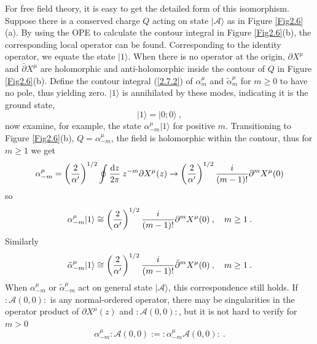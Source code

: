 For free field theory, it is easy to get the detailed form of this isomorphism. Suppose there is a conserved charge $Q$ acting on state $\lvert\mathscr{A}\rangle$ as in Figure \ref{Fig2.6}(a). By using the OPE to calculate the contour integral in Figure \ref{Fig2.6}(b), the corresponding local operator can be found. Corresponding to the identity operator, we equate the state $|1\rangle$.    
When there is no operator at the origin, $\partial X^{\mu}$ and $\bar{\partial} X^{\mu}$ are holomorphic and anti-holomorphic inside the contour of $Q$ in Figure \ref{Fig2.6}(b). Define the contour integral (\ref{2.7.2}) of $\alpha_{m}^{\mu}$ and $\tilde{\alpha}_{m}^{\mu}$ for $m \geq 0$ to have no pole, thus yielding zero.    
$\lvert 1\rangle$ is annihilated by these modes, indicating it is the ground state,    
\begin{equation}
	\lvert 1\rangle=\lvert 0 ; 0\rangle \:, \label{2.8.2}
\end{equation}
now examine, for example, the state $\alpha_{-m}^{\mu}|1\rangle$ for positive $m$.    
Transitioning to Figure \ref{Fig2.6}(b), $Q=\alpha_{-m}^{\mu}$, the field is holomorphic within the contour, thus for $m\geq 1$ we get    
\begin{equation}\label{2.8.3}
	\alpha_{-m}^{\mu}=\left(\frac{2}{\alpha^{\prime}}\right)^{1 / 2} \oint \frac{\mathrm{d} z}{2 \pi} \: z^{-m} \partial X^{\mu}(z) \rightarrow\left(\frac{2}{\alpha^{\prime}}\right)^{1 / 2} \frac{i}{(m-1) !} \partial^{m} X^{\mu}(0)
\end{equation}
so    
\begin{equation}
	\alpha_{-m}^{\mu}\lvert 1\rangle \cong\left(\frac{2}{\alpha^{\prime}}\right)^{1 / 2} \frac{i}{(m-1) !} \partial^{m} X^{\mu}(0)\:, \quad m \geq 1 \:.
	\label{2.8.4}
\end{equation}
Similarly    
\begin{equation}
	\tilde{\alpha}_{-m}^{\mu}|1\rangle \cong\left(\frac{2}{\alpha^{\prime}}\right)^{1 / 2} \frac{i}{(m-1) !} \bar{\partial}^{m} X^{\mu}(0)\:, \quad m \geq 1 \:. \label{2.8.5}
\end{equation}
When $\alpha_{-m}^{\mu}$ or $\tilde{\alpha}_{-m}^{\mu}$ act on general state $|\mathscr{A}\rangle$, this correspondence still holds.    
If $:\mathrel{ \mathscr{A}(0,0)}:$ is any normal-ordered operator, there may be singularities in the operator product of $\partial X^{\mu}(z)$ and $:\mathrel{ \mathscr{A}(0,0)}:$, 
but it is not hard to verify for $m>0$    
\begin{equation}
	\alpha_{-m}^{\mu} :\mathrel{\mathscr{A}(0,0)}:=:\mathrel{ \alpha_{-m}^{\mu} \mathscr{A}(0,0)}:  \:.
	\label{2.8.6}
\end{equation}
